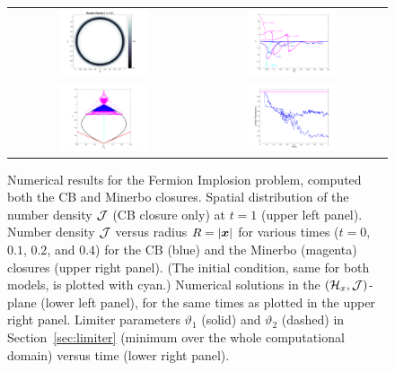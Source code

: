 \begin{figure}[h]
  \centering
  \begin{tabular}{cc}
    \includegraphics[width=0.495\textwidth]{figures/Implosion_Image} &
    \includegraphics[width=0.495\textwidth]{figures/Implosion_Lineout} \\
    \includegraphics[width=0.495\textwidth]{figures/Implosion_RealizableDomain} &
    \includegraphics[width=0.495\textwidth]{figures/Implosion_LimiterParameters}
  \end{tabular}
   \caption{Numerical results for the Fermion Implosion problem, computed both the CB and Minerbo closures.  Spatial distribution of the number density $\mathcal{J}$ (CB closure only) at $t=1$ (upper left panel).  Number density $\mathcal{J}$ versus radius $R=|\boldsymbol{x}|$ for various times ($t=0$, $0.1$, $0.2$, and $0.4$) for the CB (blue) and the Minerbo (magenta) closures (upper right panel).  (The initial condition, same for both models, is plotted with cyan.)  Numerical solutions in the $(\mathcal{H}_{x},\mathcal{J})$-plane (lower left panel), for the same times as plotted in the upper right panel.  Limiter parameters $\vartheta_{1}$ (solid) and $\vartheta_{2}$ (dashed) in Section~\ref{sec:limiter} (minimum over the whole computational domain) versus time (lower right panel).}

\end{figure}

